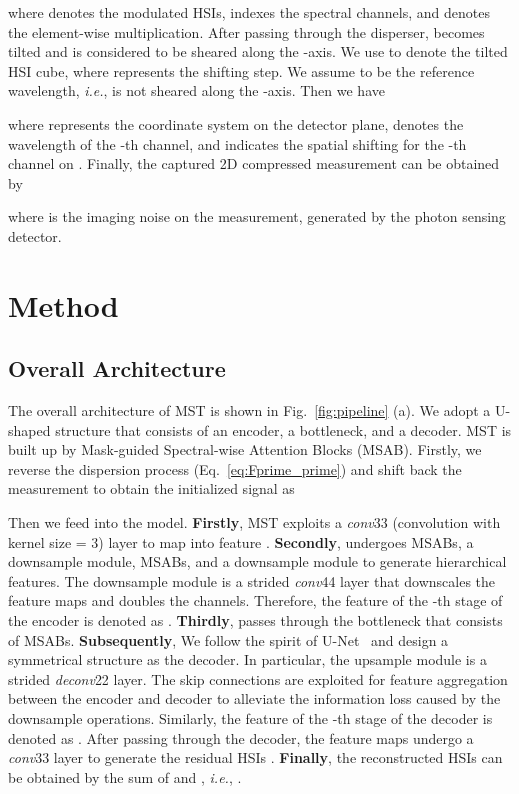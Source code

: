 \documentclass[10pt,twocolumn,letterpaper]{article}
\begin{document}
where  denotes the modulated HSIs,  indexes the spectral channels, and  denotes the element-wise multiplication. After passing through the disperser,  becomes tilted and is considered to be  sheared along the -axis. We use  to denote the tilted HSI cube, where  represents the shifting step. We assume  to be the reference wavelength, \emph{i.e.},  is not sheared along the -axis.  Then we have\vspace{-1.2mm}

where  represents the coordinate system on the detector plane,  denotes the wavelength of the -th channel, and  indicates the spatial shifting for the -th channel on . Finally, the captured 2D compressed measurement  can be obtained by
\vspace{-3.5mm}

where  is the imaging noise on the measurement, generated by the photon sensing detector. 

\vspace{-0.5mm}
\section{Method}
\vspace{-0.1mm}
\subsection{Overall Architecture}
\vspace{-0.5mm}
The overall architecture of MST is shown in Fig.~\ref{fig:pipeline} (a). We adopt a U-shaped structure that consists of an encoder, a bottleneck, and a decoder. MST is built up by Mask-guided Spectral-wise Attention Blocks (MSAB).  Firstly, we reverse the dispersion process (Eq.~\eqref{eq:Fprime_prime})  and shift back the measurement to obtain the initialized signal  as
\vspace{-1.2mm}
 
Then we feed  into the model.  \textbf{Firstly}, MST exploits a \emph{conv}33 (convolution with kernel size = 3) layer to map  into feature . \textbf{Secondly},  undergoes   MSABs, a downsample module,  MSABs, and a downsample module to generate hierarchical features. The downsample module is a strided \emph{conv}44 layer that downscales the feature maps and doubles the channels. Therefore, the feature of the -th stage of the encoder is denoted as . \textbf{Thirdly},  passes through the bottleneck that consists of  MSABs. \textbf{Subsequently}, We follow the spirit of U-Net~\cite{unet} and design a symmetrical structure as the decoder.  In particular, the upsample module is  a strided \emph{deconv}22 layer. The skip connections are exploited for feature aggregation between the encoder and decoder to alleviate the information loss caused by the downsample operations. Similarly, the feature of the -th stage of the decoder is denoted as . After passing through the decoder, the feature maps undergo a \emph{conv}33 layer to generate the residual HSIs . \textbf{Finally}, the reconstructed HSIs   can be obtained by the sum of  and , \emph{i.e.}, .
\end{document}
